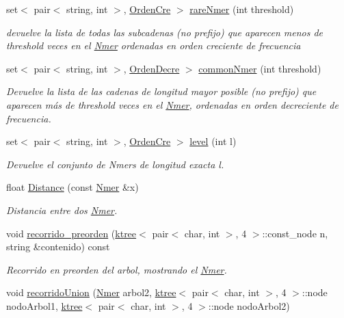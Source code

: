 \begin{DoxyCompactItemize}
set$<$ pair$<$ string, int $>$, \hyperlink{classOrdenCre}{Orden\+Cre} $>$ \hyperlink{classNmer_a8120d82bd305662b814bdcdb30698989}{rare\+Nmer} (int threshold)
\begin{DoxyCompactList}\small\item\em devuelve la lista de todas las subcadenas (no prefijo) que aparecen menos de threshold veces en el \hyperlink{classNmer}{Nmer} ordenadas en orden creciente de frecuencia \end{DoxyCompactList}\item 
set$<$ pair$<$ string, int $>$, \hyperlink{classOrdenDecre}{Orden\+Decre} $>$ \hyperlink{classNmer_aabaa2a3f2761170b5cbee0e822805de8}{common\+Nmer} (int threshold)
\begin{DoxyCompactList}\small\item\em Devuelve la lista de las cadenas de longitud mayor posible (no prefijo) que aparecen más de threshold veces en el \hyperlink{classNmer}{Nmer}, ordenadas en orden decreciente de frecuencia. \end{DoxyCompactList}\item 
set$<$ pair$<$ string, int $>$, \hyperlink{classOrdenCre}{Orden\+Cre} $>$ \hyperlink{classNmer_a97de70ffe49a0457e87ed249251b9c14}{level} (int l)
\begin{DoxyCompactList}\small\item\em Devuelve el conjunto de Nmers de longitud exacta l. \end{DoxyCompactList}\item 
float \hyperlink{classNmer_a8df2f2f355423b02413e5e29dc5639e8}{Distance} (const \hyperlink{classNmer}{Nmer} \&x)
\begin{DoxyCompactList}\small\item\em Distancia entre dos \hyperlink{classNmer}{Nmer}. \end{DoxyCompactList}\item 
void \hyperlink{classNmer_a078b799ef574e58ab3dddfc057d35b86}{recorrido\+\_\+preorden} (\hyperlink{classktree}{ktree}$<$ pair$<$ char, int $>$, 4 $>$\+::const\+\_\+node n, string \&contenido) const 
\begin{DoxyCompactList}\small\item\em Recorrido en preorden del arbol, mostrando el \hyperlink{classNmer}{Nmer}. \end{DoxyCompactList}\item 
void \hyperlink{classNmer_adbc316159fa2b4ea8ef456323862d008}{recorrido\+Union} (\hyperlink{classNmer}{Nmer} arbol2, \hyperlink{classktree}{ktree}$<$ pair$<$ char, int $>$, 4 $>$\+::node nodo\+Arbol1, \hyperlink{classktree}{ktree}$<$ pair$<$ char, int $>$, 4 $>$\+::node nodo\+Arbol2)

\end{DoxyCompactItemize}
